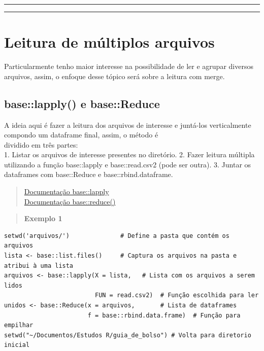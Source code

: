 \documentclass[
]{book}
\theoremstyle{definition}
\theoremstyle{definition}
\theoremstyle{definition}
\theoremstyle{definition}
\theoremstyle{remark}
\begin{document}
\begin{center}\rule{0.5\linewidth}{0.5pt}\end{center}

\begin{center}\rule{0.5\linewidth}{0.5pt}\end{center}

\hypertarget{leitura-de-muxfaltiplos-arquivos}{%
\section{Leitura de múltiplos arquivos}\label{leitura-de-muxfaltiplos-arquivos}}

Particularmente tenho maior interesse na possibilidade de ler e agrupar diversos arquivos, assim, o enfoque desse tópico será sobre a leitura com merge.

\hypertarget{baselapply-e-basereduce}{%
\subsection{base::lapply() e base::Reduce}\label{baselapply-e-basereduce}}

A ideia aqui é fazer a leitura dos arquivos de interesse e juntá-los verticalmente compondo um dataframe final, assim, o método é\\
dividido em três partes:\\
1. Listar os arquivos de interesse presentes no diretório.
2. Fazer leitura múltipla utilizando a função base::lapply e base::read.csv2 (pode ser outra).
3. Juntar os dataframes com base::Reduce e base::rbind.dataframe.

\begin{quote}
\href{https://www.rdocumentation.org/packages/base/versions/3.6.2/topics/lapply}{Documentação base::lapply}\\
\href{https://www.rdocumentation.org/packages/purrr/versions/0.2.5/topics/reduce}{Documentação base::reduce()}
\end{quote}

\begin{quote}
\textbf{Exemplo 1}
\end{quote}

\begin{verbatim}
setwd('arquivos/')              # Define a pasta que contém os arquivos
lista <- base::list.files()     # Captura os arquivos na pasta e atribui à uma lista
arquivos <- base::lapply(X = lista,   # Lista com os arquivos a serem lidos
                         FUN = read.csv2)  # Função escolhida para ler
unidos <- base::Reduce(x = arquivos,       # Lista de dataframes
                       f = base::rbind.data.frame)  # Função para empilhar
setwd("~/Documentos/Estudos R/guia_de_bolso") # Volta para diretorio inicial
\end{verbatim}
\end{document}
